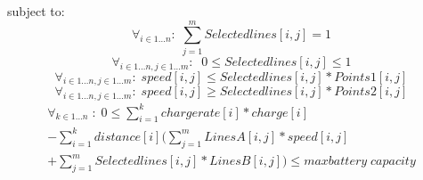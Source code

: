 subject to: 
\begin{equation}
\forall_{i\in1 \dots n }:\; \sum_{j=1}^{m} Selectedlines[i,j] = 1
\end{equation}
\begin{equation}
\forall_{i\in1 \dots n, j \in 1 \dots m}: \; \;0\leq Selectedlines[i,j] \leq 1
\end{equation}
\begin{equation}
\forall_{i\in1 \dots n, j \in 1 \dots m}:\; speed[i,j] \le Selectedlines[i,j] * Points1[i,j]
\end{equation}
\begin{equation}
\forall_{i\in1 \dots n, j \in 1 \dots m}:\; speed[i,j] \ge Selectedlines[i,j] * Points2[i,j]
\end{equation}
\begin{equation}
\begin{split}
\forall_{k\in1 \dots n}\;:\;0 \le\sum_{i=1}^{k}chargerate[i]*charge[i]\\
-\sum_{i=1}^{k} distance[i](\sum_{j=1}^{m} LinesA[i,j]*speed[i,j]\\
+\sum_{j=1}^{m} Selectedlines[i,j]*LinesB[i,j]) \le maxbattery\;capacity
\end{split}
\end{equation}

